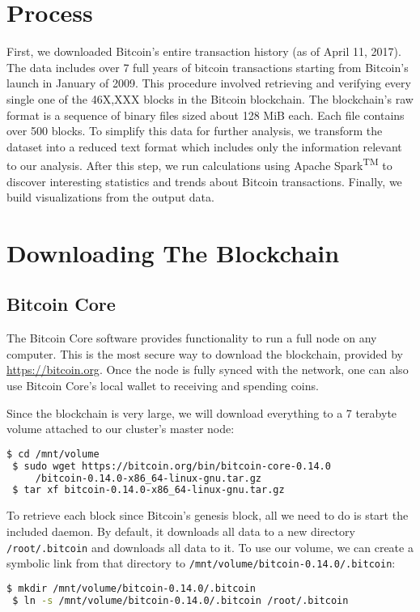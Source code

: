 \documentclass[9pt,twocolumn,twoside]{idsi}
\begin{document}
\section{Process}
First, we downloaded Bitcoin's entire transaction history (as of April 11, 2017). The data includes over 7 full years of bitcoin transactions starting from Bitcoin's launch in January of 2009. This procedure involved retrieving and verifying every single one of the 46X,XXX blocks in the Bitcoin blockchain. The blockchain's raw format is a sequence of binary files sized about 128 MiB each. Each file contains over 500 blocks. To simplify this data for further analysis, we transform the dataset into a reduced text format which includes only the information relevant to our analysis. After this step, we run calculations using Apache Spark\textsuperscript{TM} to discover interesting statistics and trends about Bitcoin transactions. Finally, we build visualizations from the output data.

\section{Downloading The Blockchain}
\subsection{Bitcoin Core}
The Bitcoin Core software provides functionality to run a full node on any computer. This is the most secure way to download the blockchain, provided by \href{https://bitcoin.org}{https://bitcoin.org}. Once the node is fully synced with the network, one can also use Bitcoin Core's local wallet to receiving and spending coins.

Since the blockchain is very large, we will download everything to a 7 terabyte volume attached to our cluster's master node:
\begin{lstlisting}[language=bash]
 $ cd /mnt/volume
 $ sudo wget https://bitcoin.org/bin/bitcoin-core-0.14.0
     /bitcoin-0.14.0-x86_64-linux-gnu.tar.gz
 $ tar xf bitcoin-0.14.0-x86_64-linux-gnu.tar.gz
\end{lstlisting}

To retrieve each block since Bitcoin's genesis block, all we need to do is start the included daemon. By default, it downloads all data to a new directory \lstinline{/root/.bitcoin} and downloads all data to it. To use our volume, we can create a symbolic link from that directory to \lstinline{/mnt/volume/bitcoin-0.14.0/.bitcoin}:
\begin{lstlisting}[language=bash]
 $ mkdir /mnt/volume/bitcoin-0.14.0/.bitcoin
 $ ln -s /mnt/volume/bitcoin-0.14.0/.bitcoin /root/.bitcoin
\end{lstlisting}
\end{document}
